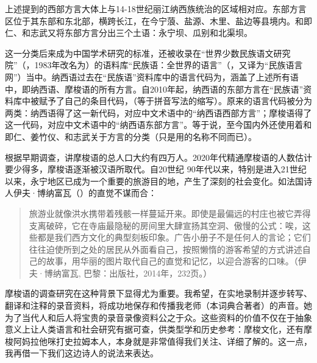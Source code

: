{\noindent}上述提到的西部{方言}大体上与14-18世纪丽江纳西族统治的区域相对应。东部{方言}区位于其东部和东北部，横跨长江，在今宁蒗、盐源、木里、盐边等县境内。和即仁、和志武又将东部{方言}分出三个土语：永宁坝、瓜别和北渠坝。

这一分类后来成为中国学术研究的标准，还被收录在“世界少数民族语文研究院”（，1983年改名为）的语料库“民族语：全世界的语言”（，又译为“民族语言网”）当中\parencite{gordon2005}。{纳西}语过去在“民族语”资料库中的语言代码为，涵盖了上述所有语中，即纳西语、摩梭语的所有{方言}。自2010年起，{纳西}语的东部{方言}在“民族语”资料库中被赋予了自己的条目代码，（等于拼音写法的缩写）。原来的语言代码被分为两类：{纳西}语得了这一新代码，对应中文术语中的“{纳西}语西部{方言}”；摩梭语得了这一代码，对应中文术语中的“{纳西}语东部{方言}”。等于说，至今国内外还使用着和即仁、姜竹仪、和志武关于方言的分类（只是用的名称不同而已）。

根据早期调查，讲摩梭语的总人口大约有四万人\parencite[107]{heetal1985}。2020年代精通摩梭语的人数估计要少得多，摩梭语逐渐被汉语所取代。自20世纪 90年代以来，特别是进入21世纪以来，永宁地区已成为一个重要的旅游目的地，产生了深刻的社会变化\parencite{milan_tourisme_2019}。如法国诗人伊夫·博纳富瓦（）的直觉不谋而合：

\begin{quote}
    旅游业就像洪水携带着残骸一样蔓延开来。即使是最偏远的村庄也被它弄得支离破碎，它在寺庙最隐秘的房间里大肆宣扬其空洞、傲慢的公式：唉，这些都是我们西方文化的典型刻板印象。广告小册子不是任何人的言论；它们往往迫使所到之处的居民从外面看自己，按照懒惰的游客希望的方式讲述自己的故事，用华丽的图片取代自己的直觉和记忆，以迎合游客的口味。（伊夫·博纳富瓦,  巴黎：出版社，2014年，232页。）
\end{quote}

摩梭语的调查研究在这种背景下显得尤为重要。我希望，在实地录制并逐步转写、翻译和注释的录音资料，将成功地保存和传播我老师（本词典合著者）的声音。她为了当代人和后人将宝贵的录音录像资料公之于众。这些资料的价值不仅在于抽象意义上让人类语言和社会研究有据可查，供类型学和历史参考：摩梭文化，还有摩梭阿妈拉他咪打史拉姆本人，本身就是非常值得我们关注、详细了解的。这一点，我再借一下我们这边诗人的说法来表达。


